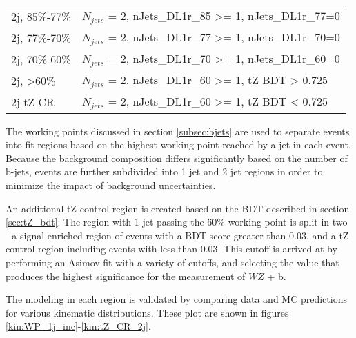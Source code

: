 \begin{table}[H]
\begin{tabular}{l|l}
2j, 85\%-77\%   & $N_{jets}$ = 2, nJets\_DL1r\_85 >= 1, nJets\_DL1r\_77=0                     \\
2j, 77\%-70\%   & $N_{jets}$ = 2, nJets\_DL1r\_77 >= 1, nJets\_DL1r\_70=0                     \\
2j, 70\%-60\%   & $N_{jets}$ = 2, nJets\_DL1r\_70 >= 1, nJets\_DL1r\_60=0                      \\
2j, >60\%       & $N_{jets}$ = 2, nJets\_DL1r\_60 >= 1, tZ BDT > 0.725 \\
2j tZ CR        & $N_{jets}$ = 2, nJets\_DL1r\_60 >= 1, tZ BDT < 0.725 \\
\hline\hline
\end{tabular}
\label{tab:regions}
\end{table}

The working points discussed in section \ref{subsec:bjets} are used to separate events into fit regions based on the highest working point reached by a jet in each event. Because the background composition differs significantly based on the number of b-jets, events are further subdivided into 1 jet and 2 jet regions in order to minimize the impact of background uncertainties.

An additional tZ control region is created based on the BDT described in section \ref{sec:tZ_bdt}. The region with 1-jet passing the 60\% working point is split in two - a signal enriched region of events with a BDT score greater than 0.03, and a tZ control region including events with less than 0.03. This cutoff is arrived at by performing an Asimov fit with a variety of cutoffs, and selecting the value that produces the highest significance for the measurement of $WZ$ + b.

The modeling in each region is validated by comparing data and MC predictions for various kinematic distributions. These plot are shown in figures \ref{kin:WP_1j_inc}-\ref{kin:tZ_CR_2j}.


